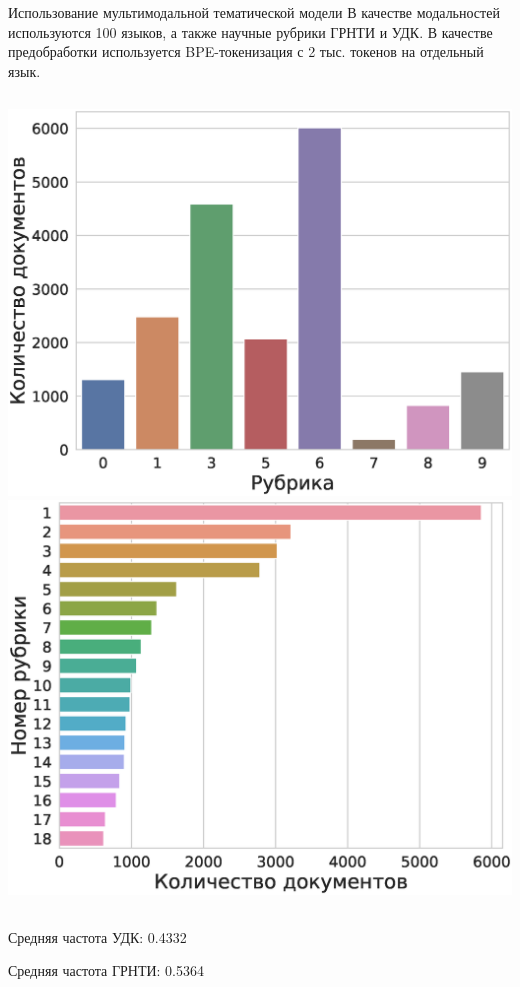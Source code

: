 \documentclass{beamer}
\begin{document}
\begin{frame}{Использование мультимодальной тематической модели}
В качестве модальностей используются {\color{red}100} языков, а также научные рубрики ГРНТИ и УДК. В качестве предобработки используется {\color{red}BPE-токенизация} с 2 тыс. токенов на отдельный язык.

\begin{columns}[c]
\includegraphics[width=1.0\textwidth]{udk.eps}
\includegraphics[width=1.0\textwidth]{grnti.eps}
\end{columns}

\bigskip
Средняя частота УДК: 0.4332

Средняя частота ГРНТИ: 0.5364
\end{frame}
\end{document}

